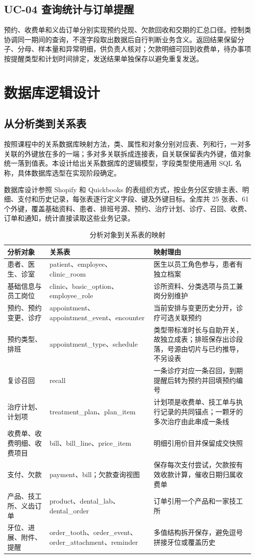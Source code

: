 \clearpage
\subsection{UC-04 查询统计与订单提醒}
预约、收费单和义齿订单分别实现预约兑现、欠款回收和交期的汇总口径。控制类协调同一期间的查询，不逐字段取出数据后自行判断业务含义。返回结果保留分子、分母、样本量和异常明细，供负责人核对；欠款明细可回到收费单，待办事项按提醒类型和计划时间排定，发送结果单独保存以避免重复发送。

\clearpage
\section{数据库逻辑设计}
\subsection{从分析类到关系表}
按照课程中的关系数据库映射方法，类、属性和对象分别对应表、列和行，一对多关联的外键放在多的一端；多对多关联拆成连接表，自关联保留表内外键，值对象统一落到值表。本设计给出关系数据库的逻辑模型，字段类型使用通用 SQL 名称，具体数据库选型在实现阶段确定。

数据库设计参照 Shopify 和 Quickbooks 的表组织方式，按业务分区安排主表、明细、支付和历史记录，每张表逐行定义字段、键及外键目标。全库共 25 张表、61 个外键，覆盖基础资料、患者、排班号源、预约、治疗计划、诊疗、召回、收费、订单和通知，统计直接读取这些业务记录。

\begin{table}[H]\centering\caption{分析对象到关系表的映射}
\small\begin{tabularx}{\textwidth}{L{3.0cm}L{5.4cm}Y}
\toprule
分析对象 & 关系表 & 映射理由\\\midrule
患者、医生、诊室 & patient、employee、clinic\_room & 医生以员工角色参与，患者有独立档案\\
基础信息与员工岗位 & clinic、basic\_option、employee\_role & 诊所资料、分类选项与员工兼岗分别维护\\
预约、预约变更、诊疗 & appointment、appointment\_event、encounter & 当前安排与变更历史分开，诊疗可选关联预约\\
预约类型、排班 & appointment\_type、schedule & 类型带标准时长与自助开关，故独立成表；排班保存出诊段落，号源由切片与已约推导，不另设表\\
复诊召回 & recall & 一条诊疗对应一条召回，到期提醒后转为预约并回填预约编号\\
治疗计划、计划项 & treatment\_plan、plan\_item & 计划项是收费单、技工单与执行记录的共同锚点；一颗牙的多次治疗由此串成一条线\\
收费单、收费明细、收费项目 & bill、bill\_line、price\_item & 明细引用价目并保留成交快照\\
支付、欠款 & payment、bill；欠款查询视图 & 保存每次支付尝试，欠款按有效收款计算，催收日期归属收费单\\
产品、技工所、义齿订单 & product、dental\_lab、dental\_order & 订单引用一个产品和一家技工所\\
牙位、进展、附件、提醒 & order\_tooth、order\_event、order\_attachment、reminder & 多值结构拆开保存，避免逗号拼接牙位或覆盖历史\\
\bottomrule\end{tabularx}\end{table}

